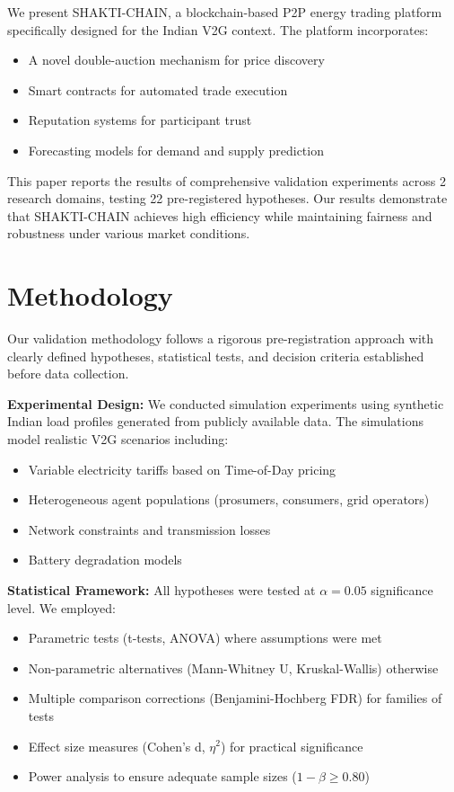 \documentclass[conference]{IEEEtran}
\begin{document}
We present SHAKTI-CHAIN, a blockchain-based P2P energy trading platform
specifically designed for the Indian V2G context. The platform incorporates:
\begin{itemize}
    \item A novel double-auction mechanism for price discovery
    \item Smart contracts for automated trade execution
    \item Reputation systems for participant trust
    \item Forecasting models for demand and supply prediction
\end{itemize}

This paper reports the results of comprehensive validation experiments across
2 research domains, testing 22 pre-registered hypotheses. Our results
demonstrate that SHAKTI-CHAIN achieves high efficiency while maintaining
fairness and robustness under various market conditions.

\section{Methodology}\label{sec:methodology}

Our validation methodology follows a rigorous pre-registration approach with
clearly defined hypotheses, statistical tests, and decision criteria established
before data collection.

\textbf{Experimental Design:} We conducted simulation experiments using
synthetic Indian load profiles generated from publicly available data. The
simulations model realistic V2G scenarios including:
\begin{itemize}
    \item Variable electricity tariffs based on Time-of-Day pricing
    \item Heterogeneous agent populations (prosumers, consumers, grid operators)
    \item Network constraints and transmission losses
    \item Battery degradation models
\end{itemize}

\textbf{Statistical Framework:} All hypotheses were tested at $\alpha = 0.05$
significance level. We employed:
\begin{itemize}
    \item Parametric tests (t-tests, ANOVA) where assumptions were met
    \item Non-parametric alternatives (Mann-Whitney U, Kruskal-Wallis) otherwise
    \item Multiple comparison corrections (Benjamini-Hochberg FDR) for families of tests
    \item Effect size measures (Cohen's d, $\eta^2$) for practical significance
    \item Power analysis to ensure adequate sample sizes ($1 - \beta \geq 0.80$)
\end{itemize}
\end{document}
